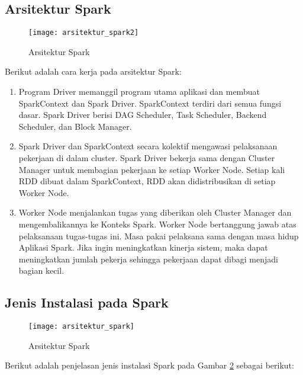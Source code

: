 \subsection{Arsitektur Spark}
\begin{figure}[H]
	\centering
	\texttt{[image: arsitektur\_spark2]}
	\caption{Arsitektur Spark}
	\label{fig:arsitektur_spark2}
\end{figure}
Berikut adalah cara kerja pada arsitektur Spark:

\begin{enumerate}

\item
Program Driver memanggil program utama aplikasi dan membuat SparkContext dan Spark Driver. SparkContext terdiri dari semua fungsi dasar. Spark Driver berisi DAG Scheduler, Task Scheduler, Backend Scheduler, dan Block Manager.

\item
Spark Driver dan SparkContext secara kolektif mengawasi pelaksanaan pekerjaan di dalam cluster. Spark Driver bekerja sama dengan Cluster Manager untuk membagian pekerjaan ke setiap Worker Node. Setiap kali RDD dibuat dalam SparkContext, RDD akan didistribusikan di setiap Worker Node.

\item
Worker Node menjalankan tugas yang diberikan oleh Cluster Manager dan mengembalikannya ke Konteks Spark. Worker Node bertanggung jawab atas pelaksanaan tugas-tugas ini. Masa pakai pelaksana sama dengan masa hidup Aplikasi Spark. Jika ingin meningkatkan kinerja sistem, maka dapat meningkatkan jumlah pekerja sehingga pekerjaan dapat dibagi menjadi bagian kecil.

\end{enumerate}


\subsection{Jenis Instalasi pada Spark}
\begin{figure}[H]
	\centering
	\texttt{[image: arsitektur\_spark]}
	\caption{Arsitektur Spark}
	\label{fig:arsitektur_spark}
\end{figure}

Berikut adalah penjelasan jenis instalasi Spark pada Gambar \ref{fig:arsitektur_spark} sebagai berikut:

